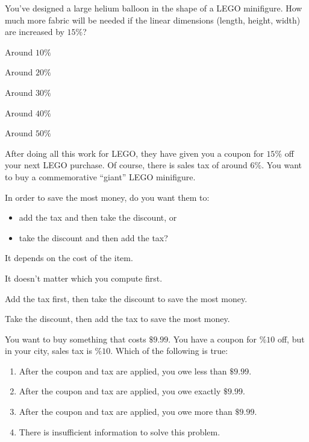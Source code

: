 \documentclass{ximera}
\begin{document}
\begin{exercise}
  You've designed a large helium balloon in the shape of a LEGO
  minifigure. How much more fabric will be needed if the linear
  dimensions (length, height, width) are increased by $15\%$?
  \begin{enumerate}\begin{multicols}{2}
    \item Around $10\%$
    \item Around $20\%$
    \item Around $30\%$
    \item Around $40\%$
    \item Around $50\%$
    \end{multicols}
  \end{enumerate}
\end{exercise}






\begin{exercise}
  After doing all this work for LEGO, they have given you a coupon for
  $15\%$ off your next LEGO purchase. Of course, there is sales tax of
  around $6\%$.  You want to buy a commemorative ``giant'' LEGO
  minifigure.

  In order to save the most money, do you want them to:
  \begin{itemize}
  \item add the tax and then take the discount, or
  \item take the discount and then add the tax?
  \end{itemize}
  \begin{enumerate}\begin{multicols}{2}
  \item It depends on the cost of the item.
  \item It doesn't matter which you compute first.
  \item Add the tax first, then take the discount to save the most money.
  \item Take the discount, then add the tax to save the most money.
    \end{multicols}
  \end{enumerate}
\end{exercise}



\begin{exercise}
  You want to buy something that costs $\$9.99$. You have a coupon for
  $\%10$ off, but in your city, sales tax is $\%10$. Which of the
  following is true:
  \begin{enumerate}
    \item After the coupon and tax are applied, you owe less than
    $\$9.99$.
    \item After the coupon and tax are applied, you owe exactly
      $\$9.99$.
    \item After the coupon and tax are applied, you owe more than
      $\$9.99$.
    \item There is insufficient information to solve this problem.
  \end{enumerate}
\end{exercise}



\end{document}
